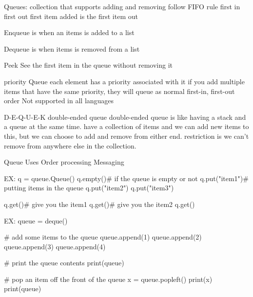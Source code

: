 Queues: 
  collection that supports adding and removing 
  follow FIFO  rule 
  first in first out 
  first item added is the first item out

  Enqueue 
    is when an items is added to a list 

  Dequeue 
    is when items is removed from a list 

  Peek 
    See the first item in the queue without removing it 

  priority Queue 
    each element has a priority associated with it 
    if you add multiple items that have the same priority, 
    they will queue as normal first-in, first-out order
    Not supported in all languages 

  D-E-Q-U-E-K 
  double-ended queue
    double-ended queue is like having a stack and a queue at the same time. 
    have a collection of items and we can add new items to this, 
    but we can choose to add and remove from either end. 
    restriction is we can't remove from anywhere else in the collection. 

  Queue Uses 
    Order processing 
    Messaging

    EX:
      q = queue.Queue()
      q.empty()# if the queue is empty or not 
      q.put("item1")# putting items in the queue 
      q.put("item2")
      q.put("item3")

      q.get()# give you the item1 
      q.get()# give you the item2
      q.get()

    EX: 
      queue = deque()

      # add some items to the queue
      queue.append(1)
      queue.append(2)
      queue.append(3)
      queue.append(4)

      # print the queue contents
      print(queue)

      # pop an item off the front of the queue
      x = queue.popleft()
      print(x)
      print(queue)